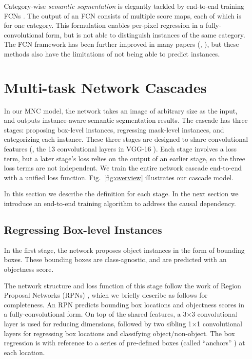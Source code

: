 \documentclass[10pt,twocolumn,letterpaper]{article}
\begin{document}
Category-wise \emph{semantic segmentation} is elegantly tackled by end-to-end training FCNs \cite{Long2015}. The output of an FCN consists of multiple score maps, each of which is for one category. This formulation enables per-pixel regression in a fully-convolutional form, but is not able to distinguish instances of the same category. The FCN framework has been further improved in many papers (\eg, \cite{Chen2015,Zheng2015}), but these methods also have the limitations of not being able to predict instances.

\section{Multi-task Network Cascades}

In our MNC model, the network takes an image of arbitrary size as the input, and outputs instance-aware semantic segmentation results. The cascade has three stages: proposing box-level instances, regressing mask-level instances, and categorizing each instance.
These three stages are designed to share convolutional features (\eg, the 13 convolutional layers in VGG-16 \cite{Simonyan2015}).
Each stage involves a loss term, but a later stage's loss relies on the output of an earlier stage, so the three loss terms are not independent. We train the entire network cascade end-to-end with a unified loss function.
Fig.~\ref{fig:overview} illustrates our cascade model.

In this section we describe the definition for each stage. In the next section we introduce an end-to-end training algorithm to address the causal dependency.

\subsection{Regressing Box-level Instances}

In the first stage, the network proposes object instances in the form of bounding boxes. These bounding boxes are class-agnostic, and are predicted with an objectness score.

The network structure and loss function of this stage follow the work of Region Proposal Networks (RPNs) \cite{Ren2015}, which we briefly describe as follows for completeness. An RPN predicts bounding box locations and objectness scores in a fully-convolutional form. On top of the shared features, a 3$\times$3 convolutional layer is used for reducing dimensions, followed by two sibling 1$\times$1 convolutional layers for regressing box locations and classifying object/non-object. The box regression is with reference to a series of pre-defined boxes (called ``anchors'' \cite{Ren2015}) at each location.
\end{document}

